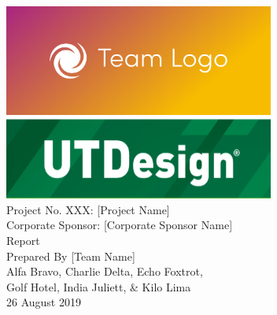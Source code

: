 \documentclass[12pt]{article}
\newcommand{\Title}{Report}
\newcommand{\Date}{26 August 2019}
\begin{document}
\thispagestyle{empty}
\begin{center}
    \includegraphics[width=3.5in]{figures/team_logo.png} \\
    \vspace{6pt}
    \includegraphics[width=3.5in]{figures/utdesign_logo.png} \\
    \vspace{0.75in}
    \Large
    Project No. XXX: [Project Name] \\
    Corporate Sponsor: [Corporate Sponsor Name] \\
    \vspace{0.75in}
    \Huge \Title \\
    \vspace{0.75in}
    \Large Prepared By [Team Name] \\
    \vspace{12pt}
    \large Alfa Bravo, Charlie Delta, Echo Foxtrot,\\ Golf Hotel, India Juliett, \& Kilo Lima \\
    \vspace{0.5in}
    \Large \Date \\
\end{center}
\clearpage

\tableofcontents
\clearpage

\listoffigures
\clearpage

\listoftables
\clearpage
\end{document}
